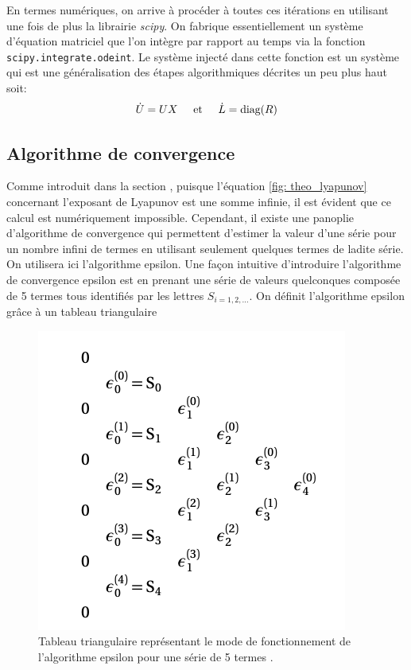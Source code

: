     En termes numériques, on arrive à procéder à toutes ces itérations en
    utilisant une fois de plus la librairie \textit{scipy}. On fabrique
    essentiellement un système d'équation matriciel que l'on intègre par
    rapport au temps via la fonction \texttt{scipy.integrate.odeint}. Le
    système injecté dans cette fonction est un système qui est une
    généralisation des étapes algorithmiques décrites un peu plus haut soit:
    \begin{align*}
        \Dot{U} = UX\hspace{0.5cm}\text{et}\hspace{0.5cm}\Dot{L} = \text{diag}(R)
    \end{align*}

\subsection{Algorithme de convergence} \label{subsec: convergence}
    Comme introduit dans la section , puisque
    l'équation \eqref{fig: theo_lyapunov} concernant l'exposant de Lyapunov
    est une somme infinie, il est évident que ce calcul est numériquement
    impossible. Cependant, il existe une panoplie d'algorithme de convergence
    qui permettent d'estimer la valeur d'une série pour un nombre infini de
    termes en utilisant seulement quelques termes de ladite série. On utilisera
    ici l'algorithme epsilon. Une façon intuitive d'introduire l'algorithme de
    convergence epsilon est en prenant une série de valeurs quelconques
    composée de 5 termes tous identifiés par les lettres $S_{i=1, 2,\dots}$.
    On définit l'algorithme epsilon grâce à un tableau triangulaire
    \begin{figure}[h!]
        \centering
        \includegraphics[scale=0.3]{figs/epsilon_tri_array.png}
        \caption{Tableau triangulaire représentant le mode de fonctionnement
        de l'algorithme epsilon pour une série de 5 termes \cite{SENECH}.}
        \label{fig: epsilon_tri_array}
    \end{figure}
